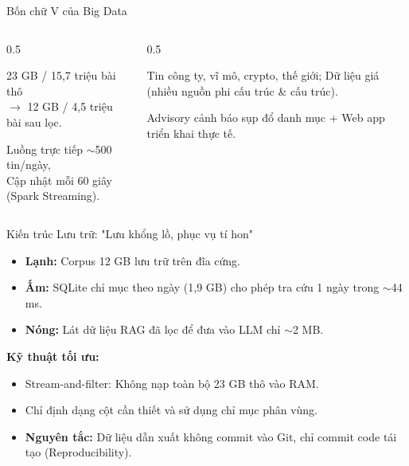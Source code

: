 \documentclass[aspectratio=169, 10pt]{beamer}
\begin{document}
\begin{frame}{Bốn chữ V của Big Data}
    \begin{columns}
        \begin{column}{0.5\textwidth}
            \begin{tcolorbox}[title=Volume (Khối lượng), colback=white, colframe=mygray, boxrule=0.5mm]
                23 GB / 15,7 triệu bài thô\\$\rightarrow$ 12 GB / 4,5 triệu bài sau lọc.
            \end{tcolorbox}
            \vspace{0.1cm}
            \begin{tcolorbox}[title=Velocity (Tốc độ), colback=white, colframe=mygray, boxrule=0.5mm]
                Luồng trực tiếp $\sim$500 tin/ngày,\\Cập nhật mỗi 60 giây (Spark Streaming).
            \end{tcolorbox}
        \end{column}
        \begin{column}{0.5\textwidth}
            \begin{tcolorbox}[title=Variety (Đa dạng), colback=white, colframe=mygray, boxrule=0.5mm]
                Tin công ty, vĩ mô, crypto, thế giới; Dữ liệu giá (nhiều nguồn phi cấu trúc \& cấu trúc).
            \end{tcolorbox}
            \vspace{0.1cm}
            \begin{tcolorbox}[title=Value (Giá trị), colback=white, colframe=mygray, boxrule=0.5mm]
                Advisory cảnh báo sụp đổ danh mục + Web app triển khai thực tế.
            \end{tcolorbox}
        \end{column}
    \end{columns}
\end{frame}

\begin{frame}{Kiến trúc Lưu trữ: "Lưu khổng lồ, phục vụ tí hon"}
    \begin{itemize}
        \item \textbf{Lạnh:} Corpus 12 GB lưu trữ trên đĩa cứng.
        \item \textbf{Ấm:} SQLite chỉ mục theo ngày (1,9 GB) cho phép tra cứu 1 ngày trong $\sim$44 ms.
        \item \textbf{Nóng:} Lát dữ liệu RAG đã lọc để đưa vào LLM chỉ $\sim$2 MB.
    \end{itemize}
    \vspace{0.3cm}
    \textbf{Kỹ thuật tối ưu:}
    \begin{itemize}
        \item Stream-and-filter: Không nạp toàn bộ 23 GB thô vào RAM.
        \item Chỉ định dạng cột cần thiết và sử dụng chỉ mục phân vùng.
        \item \textbf{Nguyên tắc:} Dữ liệu dẫn xuất không commit vào Git, chỉ commit code tái tạo (Reproducibility).
    \end{itemize}
\end{frame}
\end{document}
